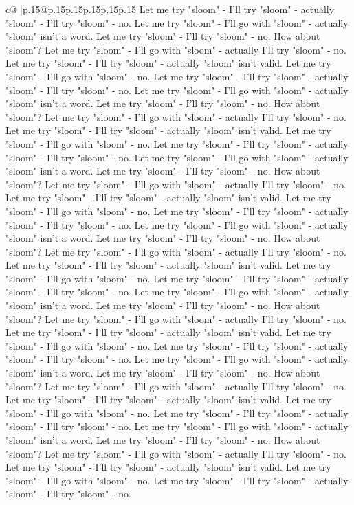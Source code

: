 \documentclass{article}
\begin{document}
{\begin{supertabular}{c@{$\;$}|p{.15\linewidth}@{}p{.15\linewidth}p{.15\linewidth}p{.15\linewidth}p{.15\linewidth}p{.15\linewidth}}
{{{Let me try "sloom" {-} I'll try "sloom" {-} actually "sloom" {-} I'll try "sloom" {-} no. Let me try "sloom" {-} I'll go with "sloom" {-} actually "sloom" isn't a word. Let me try "sloom" {-} I'll try "sloom" {-} no. How about "sloom"? Let me try "sloom" {-} I'll go with "sloom" {-} actually I'll try "sloom" {-} no. Let me try "sloom" {-} I'll try "sloom" {-} actually "sloom" isn't valid. Let me try "sloom" {-} I'll go with "sloom" {-} no. Let me try "sloom" {-} I'll try "sloom" {-} actually "sloom" {-} I'll try "sloom" {-} no. Let me try "sloom" {-} I'll go with "sloom" {-} actually "sloom" isn't a word. Let me try "sloom" {-} I'll try "sloom" {-} no. How about "sloom"? Let me try "sloom" {-} I'll go with "sloom" {-} actually I'll try "sloom" {-} no. Let me try "sloom" {-} I'll try "sloom" {-} actually "sloom" isn't valid. Let me try "sloom" {-} I'll go with "sloom" {-} no. Let me try "sloom" {-} I'll try "sloom" {-} actually "sloom" {-} I'll try "sloom" {-} no. Let me try "sloom" {-} I'll go with "sloom" {-} actually "sloom" isn't a word. Let me try "sloom" {-} I'll try "sloom" {-} no. How about "sloom"? Let me try "sloom" {-} I'll go with "sloom" {-} actually I'll try "sloom" {-} no. Let me try "sloom" {-} I'll try "sloom" {-} actually "sloom" isn't valid. Let me try "sloom" {-} I'll go with "sloom" {-} no. Let me try "sloom" {-} I'll try "sloom" {-} actually "sloom" {-} I'll try "sloom" {-} no. Let me try "sloom" {-} I'll go with "sloom" {-} actually "sloom" isn't a word. Let me try "sloom" {-} I'll try "sloom" {-} no. How about "sloom"? Let me try "sloom" {-} I'll go with "sloom" {-} actually I'll try "sloom" {-} no. Let me try "sloom" {-} I'll try "sloom" {-} actually "sloom" isn't valid. Let me try "sloom" {-} I'll go with "sloom" {-} no. Let me try "sloom" {-} I'll try "sloom" {-} actually "sloom" {-} I'll try "sloom" {-} no. Let me try "sloom" {-} I'll go with "sloom" {-} actually "sloom" isn't a word. Let me try "sloom" {-} I'll try "sloom" {-} no. How about "sloom"? Let me try "sloom" {-} I'll go with "sloom" {-} actually I'll try "sloom" {-} no. Let me try "sloom" {-} I'll try "sloom" {-} actually "sloom" isn't valid. Let me try "sloom" {-} I'll go with "sloom" {-} no. Let me try "sloom" {-} I'll try "sloom" {-} actually "sloom" {-} I'll try "sloom" {-} no. Let me try "sloom" {-} I'll go with "sloom" {-} actually "sloom" isn't a word. Let me try "sloom" {-} I'll try "sloom" {-} no. How about "sloom"? Let me try "sloom" {-} I'll go with "sloom" {-} actually I'll try "sloom" {-} no. Let me try "sloom" {-} I'll try "sloom" {-} actually "sloom" isn't valid. Let me try "sloom" {-} I'll go with "sloom" {-} no. Let me try "sloom" {-} I'll try "sloom" {-} actually "sloom" {-} I'll try "sloom" {-} no. Let me try "sloom" {-} I'll go with "sloom" {-} actually "sloom" isn't a word. Let me try "sloom" {-} I'll try "sloom" {-} no. How about "sloom"? Let me try "sloom" {-} I'll go with "sloom" {-} actually I'll try "sloom" {-} no. Let me try "sloom" {-} I'll try "sloom" {-} actually "sloom" isn't valid. Let me try "sloom" {-} I'll go with "sloom" {-} no. Let me try "sloom" {-} I'll try "sloom" {-} actually "sloom" {-} I'll try "sloom" {-} no. }}}
\end{supertabular}}
\end{document}
